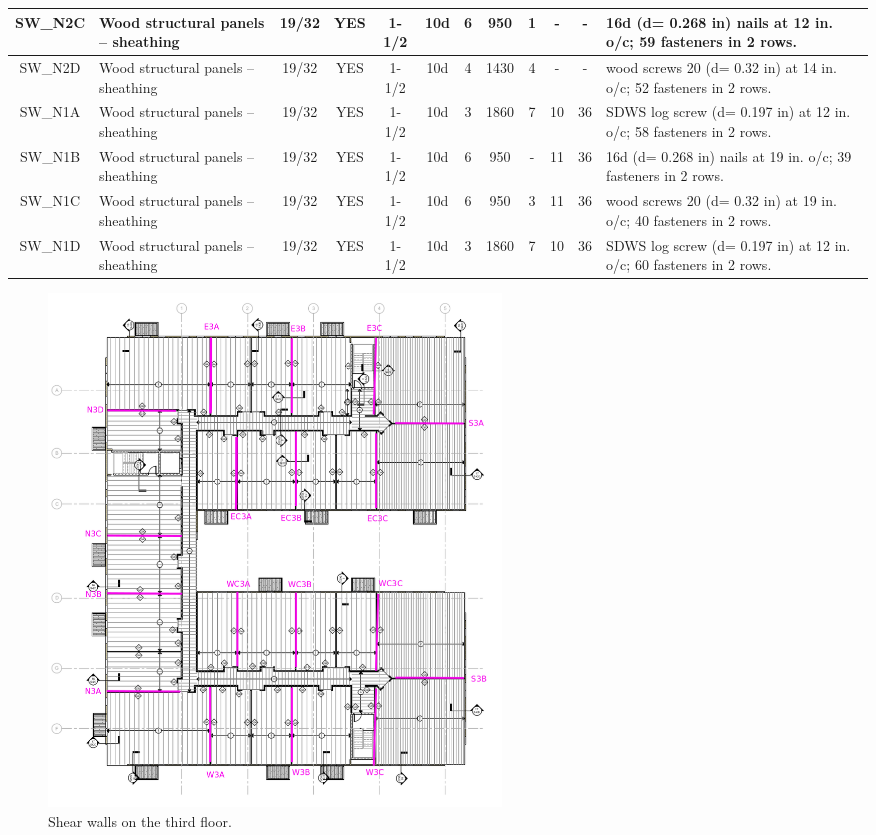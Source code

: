 \begin{center}
\begin{tiny}
\begin{longtable}{|c|p{1.5cm}|c|c|c|c|c|c|c|c|c|p{3cm}|}
\hline
SW\_N2C & Wood structural panels – sheathing & 19/32 & YES & 1-1/2 & 10d & 6 & 950 & 1 & - & - & 16d (d= 0.268 in) nails at 12 in. o/c; 59 fasteners in 2 rows.\\
\hline
SW\_N2D & Wood structural panels – sheathing & 19/32 & YES & 1-1/2 & 10d & 4 & 1430 & 4 & - & - & wood screws 20 (d= 0.32 in) at 14 in. o/c; 52 fasteners in 2 rows.\\
\hline
SW\_N1A & Wood structural panels – sheathing & 19/32 & YES & 1-1/2 & 10d & 3 & 1860 & 7 & 10 & 36 & SDWS log screw (d= 0.197 in) at 12 in. o/c; 58 fasteners in 2 rows.\\
\hline
SW\_N1B & Wood structural panels – sheathing & 19/32 & YES & 1-1/2 & 10d & 6 & 950 & - & 11 & 36 & 16d (d= 0.268 in) nails at 19 in. o/c; 39 fasteners in 2 rows.\\
\hline
SW\_N1C & Wood structural panels – sheathing & 19/32 & YES & 1-1/2 & 10d & 6 & 950 & 3 & 11 & 36 & wood screws 20 (d= 0.32 in) at 19 in. o/c; 40 fasteners in 2 rows.\\
\hline
SW\_N1D & Wood structural panels – sheathing & 19/32 & YES & 1-1/2 & 10d & 3 & 1860 & 7 & 10 & 36 & SDWS log screw (d= 0.197 in) at 12 in. o/c; 60 fasteners in 2 rows.\\
\hline
  \end{longtable}
  \end{tiny}
  \end{center}

\begin{figure}
  \begin{center}
  \includegraphics[width=120mm]{figures/3rd_floor_key_plan}
  \end{center}
  \caption{Shear walls on the third floor.}\label{fg_3rd_floor_key_plan}
\end{figure}


